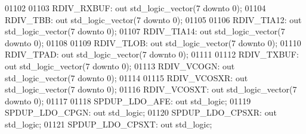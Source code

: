 \begin{DoxyCode}
01102 
01103         RDIV\_RXBUF: \textcolor{keywordflow}{out} \textcolor{comment}{std\_logic\_vector}(\textcolor{vhdllogic}{}\textcolor{vhdllogic}{7} \textcolor{keywordflow}{downto} \textcolor{vhdllogic}{}\textcolor{vhdllogic}{0});
01104         RDIV\_TBB:   \textcolor{keywordflow}{out} \textcolor{comment}{std\_logic\_vector}(\textcolor{vhdllogic}{}\textcolor{vhdllogic}{7} \textcolor{keywordflow}{downto} \textcolor{vhdllogic}{}\textcolor{vhdllogic}{0});
01105 
01106         RDIV\_TIA12: \textcolor{keywordflow}{out} \textcolor{comment}{std\_logic\_vector}(\textcolor{vhdllogic}{}\textcolor{vhdllogic}{7} \textcolor{keywordflow}{downto} \textcolor{vhdllogic}{}\textcolor{vhdllogic}{0});
01107         RDIV\_TIA14: \textcolor{keywordflow}{out} \textcolor{comment}{std\_logic\_vector}(\textcolor{vhdllogic}{}\textcolor{vhdllogic}{7} \textcolor{keywordflow}{downto} \textcolor{vhdllogic}{}\textcolor{vhdllogic}{0});
01108 
01109         RDIV\_TLOB:  \textcolor{keywordflow}{out} \textcolor{comment}{std\_logic\_vector}(\textcolor{vhdllogic}{}\textcolor{vhdllogic}{7} \textcolor{keywordflow}{downto} \textcolor{vhdllogic}{}\textcolor{vhdllogic}{0});
01110         RDIV\_TPAD:  \textcolor{keywordflow}{out} \textcolor{comment}{std\_logic\_vector}(\textcolor{vhdllogic}{}\textcolor{vhdllogic}{7} \textcolor{keywordflow}{downto} \textcolor{vhdllogic}{}\textcolor{vhdllogic}{0});
01111 
01112         RDIV\_TXBUF: \textcolor{keywordflow}{out} \textcolor{comment}{std\_logic\_vector}(\textcolor{vhdllogic}{}\textcolor{vhdllogic}{7} \textcolor{keywordflow}{downto} \textcolor{vhdllogic}{}\textcolor{vhdllogic}{0});
01113         RDIV\_VCOGN: \textcolor{keywordflow}{out} \textcolor{comment}{std\_logic\_vector}(\textcolor{vhdllogic}{}\textcolor{vhdllogic}{7} \textcolor{keywordflow}{downto} \textcolor{vhdllogic}{}\textcolor{vhdllogic}{0});
01114 
01115         RDIV\_VCOSXR:    \textcolor{keywordflow}{out} \textcolor{comment}{std\_logic\_vector}(\textcolor{vhdllogic}{}\textcolor{vhdllogic}{7} \textcolor{keywordflow}{downto} \textcolor{vhdllogic}{}\textcolor{vhdllogic}{0});
01116         RDIV\_VCOSXT:    \textcolor{keywordflow}{out} \textcolor{comment}{std\_logic\_vector}(\textcolor{vhdllogic}{}\textcolor{vhdllogic}{7} \textcolor{keywordflow}{downto} \textcolor{vhdllogic}{}\textcolor{vhdllogic}{0});
01117 
01118         SPDUP\_LDO\_AFE:  \textcolor{keywordflow}{out} \textcolor{comment}{std\_logic};
01119         SPDUP\_LDO\_CPGN: \textcolor{keywordflow}{out} \textcolor{comment}{std\_logic};
01120         SPDUP\_LDO\_CPSXR:    \textcolor{keywordflow}{out} \textcolor{comment}{std\_logic};
01121         SPDUP\_LDO\_CPSXT:    \textcolor{keywordflow}{out} \textcolor{comment}{std\_logic};

\end{DoxyCode}
